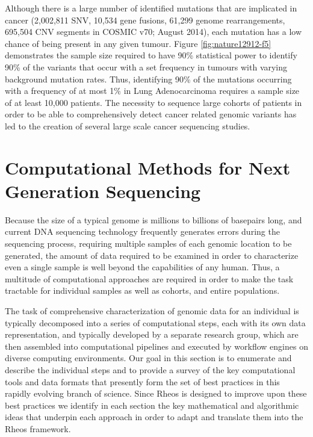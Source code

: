 Although there is a large number of identified mutations that are implicated in cancer (2,002,811 SNV,  10,534 gene fusions, 61,299 genome rearrangements, 695,504 CNV segments in COSMIC v70; August 2014)\autocite{forbes2015cosmic}, each mutation has a low chance of being present in any given tumour. Figure \ref{fig:nature12912-f5} demonstrates the sample size required to have 90\% statistical power to identify  90\% of the variants that occur with a set frequency in tumours with varying background mutation rates. Thus, identifying 90\% of the mutations occurring with a frequency of at most 1\% in Lung Adenocarcinoma requires a sample size of at least 10,000 patients. The necessity to sequence large cohorts of patients in order to be able to comprehensively detect  cancer related genomic variants has led to the creation of several large scale cancer sequencing studies.

\section[Computational Methods for NGS]{Computational Methods for Next Generation Sequencing}
Because the size of a typical genome is millions to billions of basepairs long, and current DNA sequencing technology frequently generates errors during the sequencing process\autocite{dohm2008substantial}, requiring multiple samples of each genomic location to be generated, the amount of data required to be examined in order to characterize even a single sample is well beyond the capabilities of any human. Thus, a multitude of computational approaches are required in order to make the task tractable for individual samples as well as cohorts, and entire populations.

The task of comprehensive characterization of genomic data for an individual is typically decomposed into a series of computational steps, each with its own data representation, and typically developed by a separate research group, which are then assembled into computational pipelines and executed by workflow engines on diverse computing environments\autocite{langmead2018cloud}. Our goal in this section is to enumerate and describe the individual steps and to provide a survey of the key computational tools and data formats that presently form the set of best practices in this rapidly evolving branch of science. Since Rheos is designed to improve upon these best practices we identify in each section the key mathematical and algorithmic ideas that underpin each approach in order to adapt and translate them into the Rheos framework.

